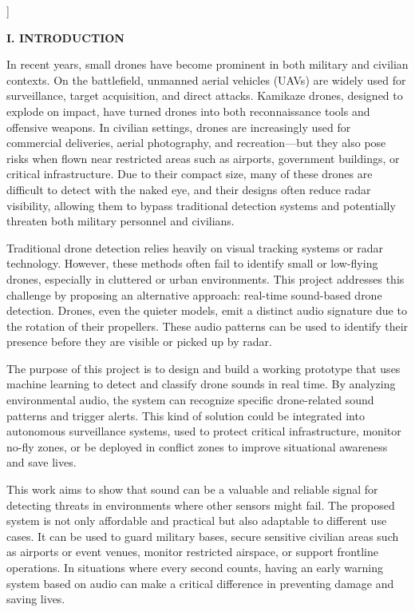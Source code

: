 \documentclass[12pt]{article}
\begin{document}
\vspace{2em} 
]

\begin{center}
{\fontsize{9}{11}\selectfont\bfseries I. INTRODUCTION} 
\end{center}

\vspace{0.5em}

{\fontsize{9}{11}\selectfont
In recent years, small drones have become prominent in both military and civilian contexts. On the battlefield, unmanned aerial vehicles (UAVs) are widely used for surveillance, target acquisition, and direct attacks. Kamikaze drones, designed to explode on impact, have turned drones into both reconnaissance tools and offensive weapons. In civilian settings, drones are increasingly used for commercial deliveries, aerial photography, and recreation—but they also pose risks when flown near restricted areas such as airports, government buildings, or critical infrastructure. Due to their compact size, many of these drones are difficult to detect with the naked eye, and their designs often reduce radar visibility, allowing them to bypass traditional detection systems and potentially threaten both military personnel and civilians.

Traditional drone detection relies heavily on visual tracking systems or radar technology. However, these methods often fail to identify small or low-flying drones, especially in cluttered or urban environments. This project addresses this challenge by proposing an alternative approach: real-time sound-based drone detection. Drones, even the quieter models, emit a distinct audio signature due to the rotation of their propellers. These audio patterns can be used to identify their presence before they are visible or picked up by radar.

The purpose of this project is to design and build a working prototype that uses machine learning to detect and classify drone sounds in real time. By analyzing environmental audio, the system can recognize specific drone-related sound patterns and trigger alerts. This kind of solution could be integrated into autonomous surveillance systems, used to protect critical infrastructure, monitor no-fly zones, or be deployed in conflict zones to improve situational awareness and save lives.

This work aims to show that sound can be a valuable and reliable signal for detecting threats in environments where other sensors might fail. The proposed system is not only affordable and practical but also adaptable to different use cases. It can be used to guard military bases, secure sensitive civilian areas such as airports or event venues, monitor restricted airspace, or support frontline operations. In situations where every second counts, having an early warning system based on audio can make a critical difference in preventing damage and saving lives.
    
}
\end{document}
